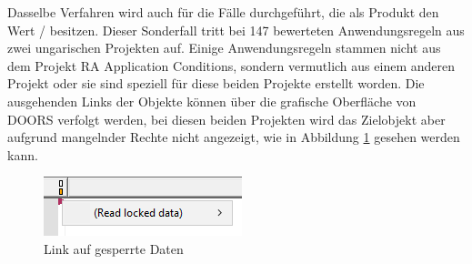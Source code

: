 Dasselbe Verfahren wird auch für die Fälle durchgeführt, die als Produkt den Wert \glqq /\grqq{} besitzen. Dieser Sonderfall tritt bei 147 bewerteten Anwendungsregeln
aus zwei ungarischen Projekten auf.
Einige Anwendungsregeln stammen nicht aus dem Projekt RA Application Conditions, sondern vermutlich aus einem anderen Projekt oder sie sind speziell 
für diese beiden Projekte erstellt worden. Die ausgehenden Links der Objekte können über die grafische Oberfläche von \ac{DOORS} verfolgt werden, bei diesen beiden Projekten
wird das Zielobjekt aber aufgrund mangelnder Rechte nicht angezeigt, wie in Abbildung \ref{fig:LockedData} gesehen werden kann. 

\begin{figure}[H]
    \centering
    \includegraphics[width = \textwidth/2]{abbildungen/LockedData.PNG}
    \caption{Link auf gesperrte Daten}
    \label{fig:LockedData}
\end{figure}
